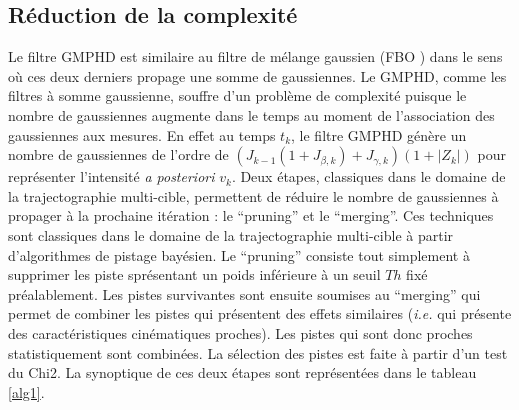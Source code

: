 \documentclass[10pt,french,a4paper]{report}
\begin{document}
 \subsection{Réduction de la complexité}
Le filtre \ac{GMPHD} est similaire au filtre de mélange gaussien (FBO \cite{BarShalom88}) dans le sens où ces deux derniers propage une somme de gaussiennes. Le \ac{GMPHD}, comme les filtres à somme gaussienne, souffre d'un problème de complexité puisque le nombre de gaussiennes augmente dans le temps au moment de l'association des gaussiennes aux mesures. En effet au temps $t_k$, le filtre \ac{GMPHD} génère un nombre de gaussiennes de l'ordre de $(J_{k-1}(1+J_{\beta ,k})+J_{\gamma ,k})(1+|Z_k|)$ pour représenter l'intensité \textit{a posteriori} $v_k$. Deux étapes, classiques dans le domaine de la trajectographie multi-cible, permettent de réduire le nombre de gaussiennes à propager à la prochaine itération : le ``pruning'' et le ``merging''. Ces techniques sont classiques dans le domaine de la trajectographie multi-cible à partir d'algorithmes de pistage bayésien. Le ``pruning'' consiste tout simplement à supprimer les piste sprésentant un poids inférieure à un seuil $Th$ fixé préalablement. Les pistes survivantes sont ensuite soumises au ``merging'' qui permet de combiner les pistes qui présentent des effets similaires (\textit{i.e.} qui présente des caractéristiques cinématiques proches). Les pistes qui sont donc proches statistiquement sont combinées. La sélection des pistes est faite à partir d'un test du Chi2. La synoptique de ces deux étapes sont représentées dans le tableau \ref{alg1}.
\end{document}
